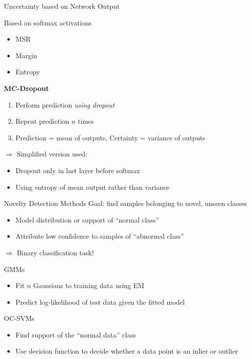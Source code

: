 \documentclass{beamer}
\begin{document}
\begin{frame}{Uncertainty based on Network Output}

\begin{block}{Based on softmax activations}
\begin{itemize}
	\item \gls{MSR}
	\item Margin
	\item Entropy
\end{itemize}	
\end{block}

\begin{block}{\textbf{\gls{MC-Dropout}}}
	\begin{enumerate}
		\item Perform prediction \textit{using dropout}
		\item Repeat prediction $n$ times
		\item Prediction = mean of outputs, Certainty = variance of outputs
	\end{enumerate}
	$\Rightarrow$ Simplified version used:
	\begin{itemize}
		\item Dropout only in last layer before softmax
		\item Using entropy of mean output rather than variance
	\end{itemize}
\end{block}
\end{frame}


\begin{frame}{Novelty Detection Methods}
Goal: find samples belonging to novel, unseen classes
\begin{itemize}
	\item Model distribution or support of ``normal class''
	\item Attribute low confidence to samples of ``abnormal class''
\end{itemize}
$\Rightarrow$ Binary classification task!
\begin{block}{\glspl{GMM}}
\begin{itemize}
	\item Fit $n$ Gaussians to training data using \gls{EM}
	\item Predict log-likelihood of test data given the fitted model
\end{itemize}
\end{block}
\begin{block}{\glspl{OC-SVM}}
	\begin{itemize}
		\item Find support of the ``normal data'' class
		\item Use decision function to decide whether a data point is an inlier or outlier
	\end{itemize}
\end{block}
\end{frame}
\end{document}
